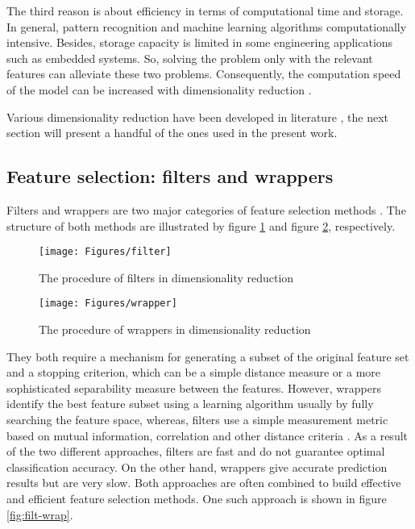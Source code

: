 The third reason is about efficiency in terms of computational time and storage. In general, pattern recognition and machine learning algorithms computationally intensive. Besides, storage capacity is limited in some engineering applications such as embedded systems. So, solving the problem only with the relevant features can alleviate these two problems. Consequently, the computation speed of the model can be increased with dimensionality reduction \cite{hybr2011}.

Various dimensionality reduction have been developed in literature \cite{sima2013} \cite{effi2016} \cite{hybr2011} \cite{newh2016}, 
the next section will present a handful of the ones used in the present work. 


\subsection{Feature selection: filters and wrappers}
Filters and wrappers are two major categories of feature selection methods \cite{effi2016} \cite{newh2016} \cite{hybr2011} \cite{sima2013}. %
The structure of both methods are illustrated by figure \ref{fig:filt} and figure \ref{fig:wrap}, respectively.
\begin{figure}[ht!]
	\centering
	\texttt{[image: Figures/filter]}
	\caption{The procedure of filters in dimensionality reduction}{\cite{hybr2011}}
	\label{fig:filt}
\end{figure}
\begin{figure}[ht!]
	\centering
	\texttt{[image: Figures/wrapper]}
	\caption{The procedure of wrappers in dimensionality reduction}{\cite{hybr2011}}
	\label{fig:wrap}
\end{figure}
They both require a mechanism for generating a subset of the original feature set and a stopping criterion, which can be a simple distance measure or a more sophisticated separability measure between the features. However, wrappers identify the best feature subset using a learning algorithm usually by fully searching the feature space, whereas, filters use a simple measurement metric based on mutual information, correlation and other distance criteria \cite{hybr2011} \cite{sima2013}.
As a result of the two different approaches, filters are fast and do not guarantee optimal classification accuracy. On the other hand, wrappers give accurate prediction results but are very slow.
Both approaches are often combined to build effective and efficient feature selection methods. One such approach is shown in figure \ref{fig:filt-wrap}. 
